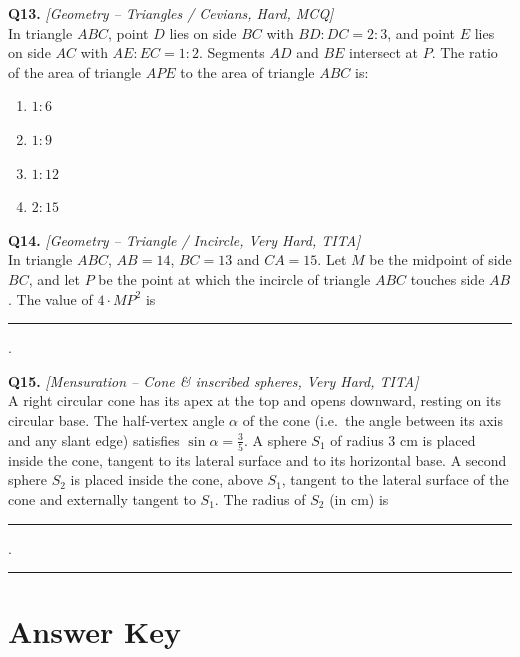 \documentclass[11pt,a4paper]{article}
\begin{document}
\textbf{Q13.} \textit{[Geometry -- Triangles / Cevians, Hard, MCQ]}\\
In triangle $ABC$, point $D$ lies on side $BC$ with $BD : DC = 2 : 3$, and point $E$ lies on side $AC$ with $AE : EC = 1 : 2$. Segments $AD$ and $BE$ intersect at $P$. The ratio of the area of triangle $APE$ to the area of triangle $ABC$ is:
\begin{enumerate}[label=(\Alph*)]
  \item $1 : 6$
  \item $1 : 9$
  \item $1 : 12$
  \item $2 : 15$
\end{enumerate}

\textbf{Q14.} \textit{[Geometry -- Triangle / Incircle, Very Hard, TITA]}\\
In triangle $ABC$, $AB = 14$, $BC = 13$ and $CA = 15$. Let $M$ be the midpoint of side $BC$, and let $P$ be the point at which the incircle of triangle $ABC$ touches side $AB$. The value of $4 \cdot MP^{2}$ is \rule{2cm}{0.4pt}.

\textbf{Q15.} \textit{[Mensuration -- Cone \& inscribed spheres, Very Hard, TITA]}\\
A right circular cone has its apex at the top and opens downward, resting on its circular base. The half-vertex angle $\alpha$ of the cone (i.e.\ the angle between its axis and any slant edge) satisfies $\sin \alpha = \tfrac{3}{5}$. A sphere $S_{1}$ of radius 3 cm is placed inside the cone, tangent to its lateral surface and to its horizontal base. A second sphere $S_{2}$ is placed inside the cone, above $S_{1}$, tangent to the lateral surface of the cone and externally tangent to $S_{1}$. The radius of $S_{2}$ (in cm) is \rule{2cm}{0.4pt}.

\vspace{8pt}\hrule

\section*{Answer Key}
\end{document}
